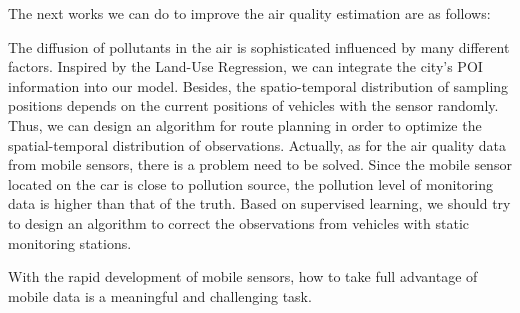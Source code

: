 \documentclass[twoside,leqno,twocolumn]{article}
\begin{document}
The next works we can do to improve the air quality estimation are as follows:

The diffusion of pollutants in the air is sophisticated influenced by many different factors. Inspired by the Land-Use Regression, we can integrate the city's POI information into our model. Besides, the spatio-temporal distribution of sampling positions depends on the current positions of vehicles with the sensor randomly. Thus, we can design an algorithm for route planning in order to optimize the spatial-temporal distribution of observations. Actually, as for the air quality data from mobile sensors, there is a problem need to be solved. Since the mobile sensor located on the car is close to pollution source, the pollution level of monitoring data is higher than that of the truth. Based on supervised learning, we should try to design an algorithm to correct the observations from vehicles with static monitoring stations.

With the rapid development of mobile sensors, how to take full advantage of mobile data is a meaningful and challenging task.


\end{document}
